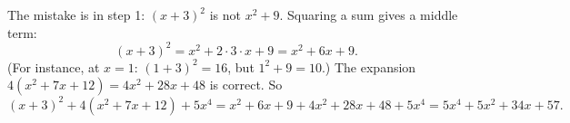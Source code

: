 The mistake is in step 1: $(x+3)^2$ is not $x^2+9$. Squaring a sum gives a middle term:
\[
(x+3)^2=x^2+2\cdot3\cdot x+9=x^2+6x+9 .
\]
(For instance, at $x=1$: $(1+3)^2=16$, but $1^2+9=10$.) The expansion $4(x^2+7x+12)=4x^2+28x+48$ is correct. So
\[
(x+3)^2+4(x^2+7x+12)+5x^4=x^2+6x+9+4x^2+28x+48+5x^4=\boxed{5x^4+5x^2+34x+57}.
\]
